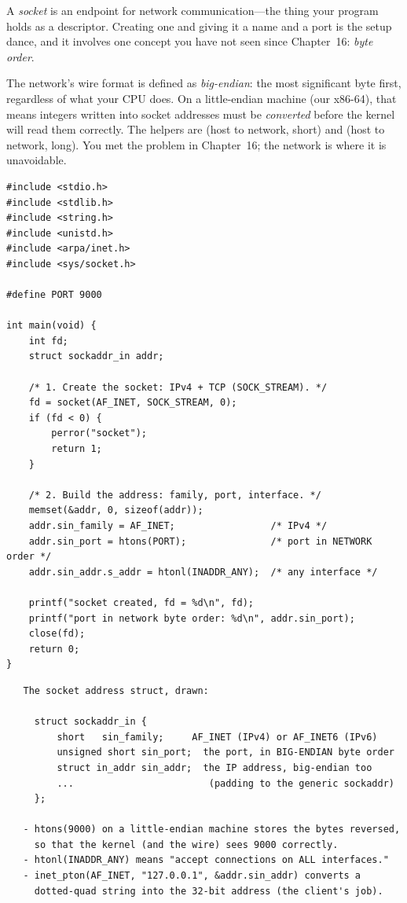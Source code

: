 A \emph{socket} is an endpoint for network communication---the thing
your program holds as a descriptor. Creating one and giving it a name
and a port is the setup dance, and it involves one concept you have
not seen since Chapter~16: \emph{byte order}.

The network's wire format is defined as \emph{big-endian}: the most
significant byte first, regardless of what your CPU does. On a
little-endian machine (our x86-64), that means integers written into
socket addresses must be \emph{converted} before the kernel will read
them correctly. The helpers are  (host to network, short)
and  (host to network, long). You met the problem in
Chapter~16; the network is where it is unavoidable.

\begin{lstlisting}[caption={Creating a socket address in network byte order.}]
#include <stdio.h>
#include <stdlib.h>
#include <string.h>
#include <unistd.h>
#include <arpa/inet.h>
#include <sys/socket.h>

#define PORT 9000

int main(void) {
    int fd;
    struct sockaddr_in addr;

    /* 1. Create the socket: IPv4 + TCP (SOCK_STREAM). */
    fd = socket(AF_INET, SOCK_STREAM, 0);
    if (fd < 0) {
        perror("socket");
        return 1;
    }

    /* 2. Build the address: family, port, interface. */
    memset(&addr, 0, sizeof(addr));
    addr.sin_family = AF_INET;                 /* IPv4 */
    addr.sin_port = htons(PORT);               /* port in NETWORK order */
    addr.sin_addr.s_addr = htonl(INADDR_ANY);  /* any interface */

    printf("socket created, fd = %d\n", fd);
    printf("port in network byte order: %d\n", addr.sin_port);
    close(fd);
    return 0;
}
\end{lstlisting}

\begin{verbatim}
   The socket address struct, drawn:

     struct sockaddr_in {
         short   sin_family;     AF_INET (IPv4) or AF_INET6 (IPv6)
         unsigned short sin_port;  the port, in BIG-ENDIAN byte order
         struct in_addr sin_addr;  the IP address, big-endian too
         ...                        (padding to the generic sockaddr)
     };

   - htons(9000) on a little-endian machine stores the bytes reversed,
     so that the kernel (and the wire) sees 9000 correctly.
   - htonl(INADDR_ANY) means "accept connections on ALL interfaces."
   - inet_pton(AF_INET, "127.0.0.1", &addr.sin_addr) converts a
     dotted-quad string into the 32-bit address (the client's job).
\end{verbatim}

